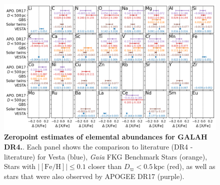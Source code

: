 \documentclass[
  journal=pasa,
  manuscript=research-paper, %
  year=2024,
  volume=37
]{cup-journal}
\newcommand{\Gaia}{\textit{Gaia}\xspace}
\begin{document}
\begin{figure}[ht]
 \centering
 \includegraphics[width=\textwidth]{figures/galah_dr4_zeropoint_checks_allstar.png}
 \caption{\textbf{Zeropoint estimates of elemental abundances for GALAH DR4.}. Each panel shows the comparison to literature (DR4 - literature) for Vesta (blue), \Gaia FKG Benchmark Stars (orange), Stars with $\vert \mathrm{[Fe/H]} \vert \leq 0.1$ closer than $D_\varpi < 0.5\,\mathrm{kpc}$ (red), as well as stars that were also observed by APOGEE DR17 (purple).}
 \label{fig:galah_dr4_zeropoint_checks_allstar}
\end{figure}
\end{document}

